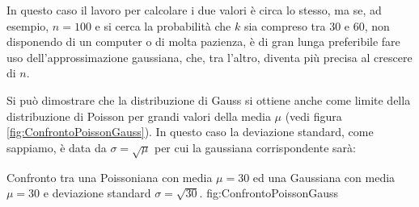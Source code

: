 \begin{exemplify}
{In questo caso il lavoro per calcolare i due valori \`e circa lo
stesso, ma se, ad esempio, $n=100$ e si cerca la probabilit\`a che $k$ sia
compreso tra $30$ e $60$, non disponendo di un computer o di molta pazienza,
\`e di gran lunga preferibile fare uso dell'approssimazione gaussiana,
che, tra l'altro, diventa pi\`u precisa al crescere di $n$.}

\end{exemplify}

Si pu\`o dimostrare che la distribuzione di Gauss si ottiene
anche come limite della distribuzione di Poisson
 per grandi valori
della media $\mu$ (vedi figura \ref{fig:ConfrontoPoissonGauss}).
In questo caso la deviazione standard, come sappiamo,
\`e data da $\sigma = \sqrt{\mu}$ per cui la gaussiana corrispondente
sar\`a:

\panelfig
{}
{Confronto tra una Poissoniana con media $\mu=30$
ed una Gaussiana con media $\mu=30$ e deviazione standard $\sigma=\sqrt{30}$.}
{fig:ConfrontoPoissonGauss}


